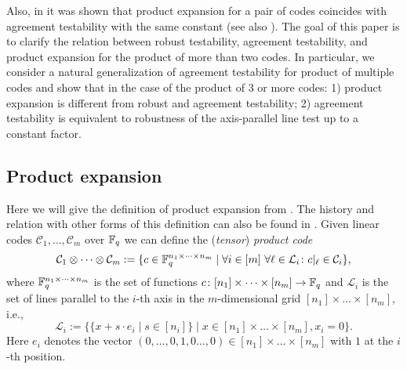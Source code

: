 \documentclass[11pt]{article}
\newcommand{\cC}{\mathcal{C}}
\newcommand{\cL}{\mathcal{L}}
\begin{document}
Also, in \cite[Lemma 1]{PK2022robust} it was shown that product expansion for a pair of codes coincides with agreement testability with the same constant (see also \cite[Section 2.6]{Dinur:decoders}).
The goal of this paper is to clarify the relation between robust testability, agreement testability, and product expansion for the product of more than two codes.
In particular, we consider a natural generalization of agreement testability for product of multiple codes and show that in the case of the product of 3 or more codes: 1) product expansion is different from robust and agreement testability; 2) agreement testability is equivalent to robustness of the axis-parallel line test up to a constant factor.

\subsection{Product expansion}
Here we will give the definition of product expansion from \cite{PK2022robust}. 
The history and relation with other forms of this definition can also be found in \cite{PK2022robust}.
Given linear codes $\cC_1,\dots,\cC_m$ over $\mathbb{F}_q$ we can define the (\emph{tensor}) \emph{product code} 
\[
\cC_1\otimes\dots\otimes\cC_m := \{c\in \F_q^{n_1\times\dots\times n_m} \mid \forall i\in [m]\ \forall \ell\in \cL_i\colon c|_\ell\in  \cC_i\},
\]
where $\mathbb{F}_q^{n_1\times\dots\times n_m}$ is the set of functions $c\colon[n_1]\times \dots\times [n_m] \to \mathbb{F}_q$  and $\cL_i$ is the set of lines parallel to the $i$-th axis in the $m$-dimensional grid $[n_1]\times \dots\times [n_m]$, i.e., 
\[
\cL_i := \{\{x + s\cdot e_i \mid s \in [n_i] \} \mid x\in [n_1]\times \dots\times [n_m], x_i = 0 \}.
\]
Here $e_i$ denotes the vector $(0,\dots,0,1,0\dots,0) \in [n_1]\times \dots \times [n_m]$ with $1$ at the $i$-th position. 
\end{document}
